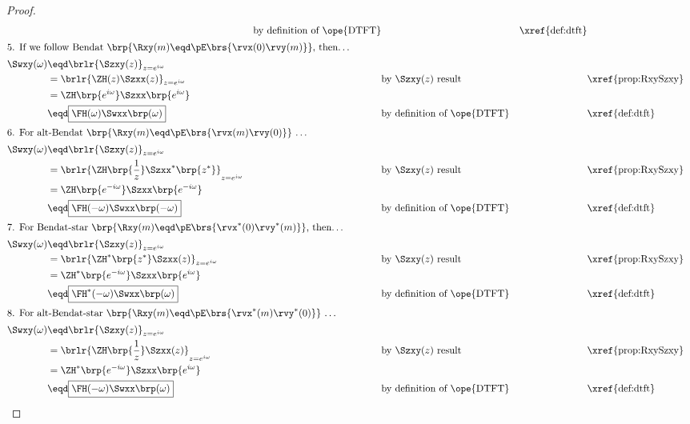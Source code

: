 \begin{proof}
\begin{align*}
      && \text{by definition of \ope{DTFT}}
      && \text{\xref{def:dtft}}
\\
\intertext{5. If we follow Bendat $\brp{\Rxy(m)\eqd\pE\brs{\rvx(0)\rvy(m)}}$, then\ldots}
    \Swxy(\omega)
      &\eqd \brlr{\Szxy(z)}_{z=e^{i\omega}}
    \\&=    \brlr{\ZH(z) \Szxx(z)}_{z=e^{i\omega}}
      &&    \text{by $\Szxy(z)$ result}
      &&    \text{\xref{prop:RxySzxy}}
    \\&=    \ZH\brp{e^{i\omega}} \Szxx\brp{e^{i\omega}}
    \\&\eqd \boxed{\FH(\omega) \Swxx\brp(\omega)}
      && \text{by definition of \ope{DTFT}}
      && \text{\xref{def:dtft}}
\\
\intertext{6. For alt-Bendat $\brp{\Rxy(m)\eqd\pE\brs{\rvx(m)\rvy(0)}}$ \ldots}
    \Swxy(\omega)
      &\eqd \brlr{\Szxy(z)}_{z=e^{i\omega}}
    \\&=    \brlr{\ZH\brp{\frac{1}{z}} \Szxx^\ast\brp{z^\ast}}_{z=e^{i\omega}}
      &&    \text{by $\Szxy(z)$ result}
      &&    \text{\xref{prop:RxySzxy}}
    \\&=    \ZH\brp{e^{-i\omega}} \Szxx\brp{e^{-i\omega}}
    \\&\eqd \boxed{\FH(-\omega) \Swxx\brp(-\omega)}
      && \text{by definition of \ope{DTFT}}
      && \text{\xref{def:dtft}}
\\
\intertext{7. For Bendat-star $\brp{\Rxy(m)\eqd\pE\brs{\rvx^\ast(0)\rvy^\ast(m)}}$, then\ldots}
    \Swxy(\omega)
      &\eqd \brlr{\Szxy(z)}_{z=e^{i\omega}}
    \\&=    \brlr{\ZH^\ast\brp{z^\ast} \Szxx(z)}_{z=e^{i\omega}}
      &&    \text{by $\Szxy(z)$ result}
      &&    \text{\xref{prop:RxySzxy}}
    \\&=    \ZH^\ast\brp{e^{-i\omega}} \Szxx\brp{e^{i\omega}}
    \\&\eqd \boxed{\FH^\ast(-\omega) \Swxx\brp(\omega)}
      && \text{by definition of \ope{DTFT}}
      && \text{\xref{def:dtft}}
\\
\intertext{8. For alt-Bendat-star $\brp{\Rxy(m)\eqd\pE\brs{\rvx^\ast(m)\rvy^\ast(0)}}$ \ldots}
    \Swxy(\omega)
      &\eqd \brlr{\Szxy(z)}_{z=e^{i\omega}}
    \\&=    \brlr{\ZH\brp{\frac{1}{z}} \Szxx(z)}_{z=e^{i\omega}}
      &&    \text{by $\Szxy(z)$ result}
      &&    \text{\xref{prop:RxySzxy}}
    \\&=    \ZH^\ast\brp{e^{-i\omega}} \Szxx\brp{e^{i\omega}}
    \\&\eqd \boxed{\FH(-\omega) \Swxx\brp(\omega)}
      && \text{by definition of \ope{DTFT}}
      && \text{\xref{def:dtft}}
  \end{align*}
\end{proof}

